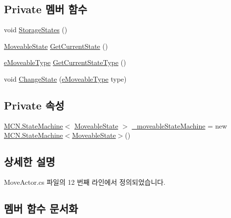 \subsection*{Private 멤버 함수}
\begin{DoxyCompactItemize}
\item 
void \hyperlink{class_move_actor_a34b9e1ec5019892f38a8d5087bd5c2fe}{Storage\+States} ()
\item 
\hyperlink{class_move_actor_1_1_moveable_state}{Moveable\+State} \hyperlink{class_move_actor_a5b39cf27e1929b766133c6b56031ebdc}{Get\+Current\+State} ()
\item 
\hyperlink{_move_actor_8cs_a90215797ba850e199f3ef63d7c56f132}{e\+Moveable\+Type} \hyperlink{class_move_actor_a85a48e1d0414d35588b56e36d42fbd3b}{Get\+Current\+State\+Type} ()
\item 
void \hyperlink{class_move_actor_a82120e64a04913f530ac5a2aaec3ce91}{Change\+State} (\hyperlink{_move_actor_8cs_a90215797ba850e199f3ef63d7c56f132}{e\+Moveable\+Type} type)
\end{DoxyCompactItemize}
\subsection*{Private 속성}
\begin{DoxyCompactItemize}
\item 
\hyperlink{class_m_c_n_1_1_state_machine}{M\+C\+N.\+State\+Machine}$<$ \hyperlink{class_move_actor_1_1_moveable_state}{Moveable\+State} $>$ \hyperlink{class_move_actor_a72afe80e236dbb9a66b27f752e8231f1}{\+\_\+moveable\+State\+Machine} = new \hyperlink{class_m_c_n_1_1_state_machine}{M\+C\+N.\+State\+Machine}$<$\hyperlink{class_move_actor_1_1_moveable_state}{Moveable\+State}$>$()
\end{DoxyCompactItemize}


\subsection{상세한 설명}


Move\+Actor.\+cs 파일의 12 번째 라인에서 정의되었습니다.



\subsection{멤버 함수 문서화}
